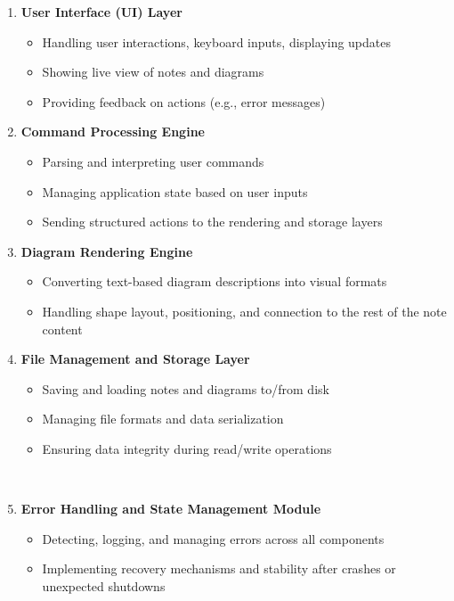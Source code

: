 \documentclass{article}
\begin{document}
\begin{enumerate}
    \item \textbf{User Interface (UI) Layer}
    \begin{itemize}
        \item Handling user interactions, keyboard inputs, displaying updates
        \item Showing live view of notes and diagrams
        \item Providing feedback on actions (e.g., error messages)
    \end{itemize}
    \item \textbf{Command Processing Engine}
    \begin{itemize}
        \item Parsing and interpreting user commands
        \item Managing application state based on user inputs
        \item Sending structured actions to the rendering and storage layers
    \end{itemize}
    \item \textbf{Diagram Rendering Engine}
    \begin{itemize}
        \item Converting text-based diagram descriptions into visual formats
        \item Handling shape layout, positioning, and connection to the rest of
        the note content
    \end{itemize}
    \item \textbf{File Management and Storage Layer}
    \begin{itemize}
        \item Saving and loading notes and diagrams to/from disk
        \item Managing file formats and data serialization
        \item Ensuring data integrity during read/write operations
    \end{itemize}\
    \item \textbf{Error Handling and State Management Module}
    \begin{itemize}
        \item Detecting, logging, and managing errors across all components
        \item Implementing recovery mechanisms and stability after crashes or
        unexpected shutdowns
    \end{itemize}
\end{enumerate}
\end{document}
